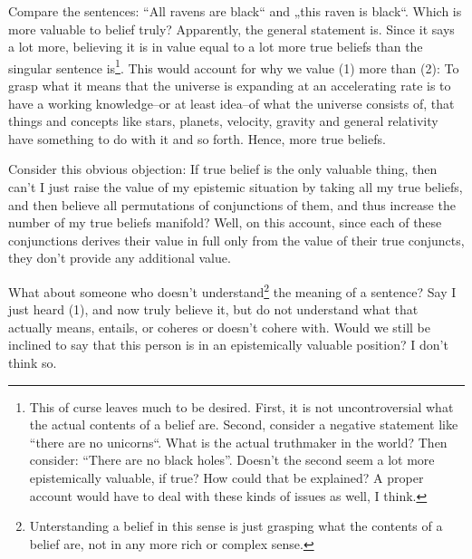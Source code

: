 \documentclass[12pt,numbers=noenddot]{scrartcl}
\begin{document}
Compare the sentences: “All ravens are black“ and „this raven is black“. Which is more valuable to belief truly? Apparently, the general statement is. Since it says a lot more, believing it is in value equal to a lot more true beliefs than the singular sentence is\footnote{\label{foot:noblackholes}This of curse leaves much to be desired. First, it is not uncontroversial what the actual contents of a belief are. Second, consider a negative statement like “there are no unicorns“. What is the actual truthmaker in the world? Then consider: “There are no black holes”. Doesn't the second seem a lot more epistemically valuable, if true? How could that be explained? A proper account would have to deal with these kinds of issues as well, I think.}.
This would account for why we value (1) more than (2): To grasp what it means that the universe is expanding at an accelerating rate is to have a working knowledge–or at least idea–of what the universe consists of, that things and concepts like stars, planets, velocity, gravity and general relativity have something to do with it and so forth. Hence, more true beliefs.

Consider this obvious objection: If true belief is the only valuable thing, then can't I just raise the value of my epistemic situation by taking all my true beliefs, and then believe all permutations of conjunctions of them, and thus increase the number of my true beliefs manifold? Well, on this account, since each of these conjunctions derives their value in full only from the value of their true conjuncts, they don't provide any additional value.

What about someone who doesn't understand\footnote{Unterstanding a belief in this sense is just grasping what the contents of a belief are, not in any more rich or complex sense.} the meaning of a sentence? Say I just heard (1), and now truly believe it, but do not understand what that actually means, entails, or coheres or doesn't cohere with. Would we still be inclined to say that this person is in an epistemically valuable position? I don't think so. 
\end{document}

